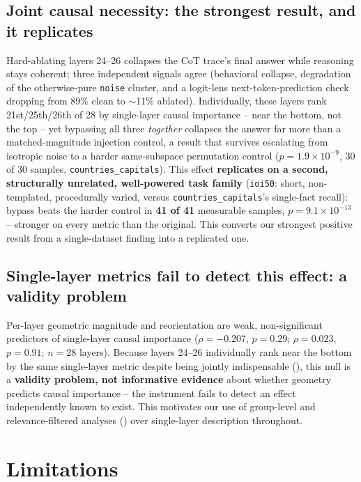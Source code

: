 \documentclass{article}
\theoremstyle{plain}
\theoremstyle{definition}
\theoremstyle{remark}
\begin{document}
\subsection{Joint causal necessity: the strongest result, and it replicates}
\label{sec:results:necessity}

Hard-ablating layers 24--26 collapses the CoT trace's final answer while reasoning stays
coherent; three independent signals agree (behavioral collapse, degradation of the
otherwise-pure \texttt{noise} cluster, and a logit-lens next-token-prediction check
dropping from 89\% clean to $\sim$11\% ablated). Individually, these layers rank
21st/25th/26th of 28 by single-layer causal importance -- near the bottom, not the top --
yet bypassing all three \emph{together} collapses the answer far more than a
matched-magnitude injection control, a result that survives escalating from isotropic
noise to a harder same-subspace permutation control ($p=1.9\times10^{-9}$, 30 of 30
samples, \texttt{countries\_capitals}). This effect \textbf{replicates on a second,
structurally unrelated, well-powered task family} (\texttt{ioi50}: short, non-templated,
procedurally varied, versus \texttt{countries\_capitals}'s single-fact recall): bypass
beats the harder control in \textbf{41 of 41} measurable samples,
$p=9.1\times10^{-13}$ -- stronger on every metric than the original. This converts our
strongest positive result from a single-dataset finding into a replicated one.

\subsection{Single-layer metrics fail to detect this effect: a validity problem}
\label{sec:results:validity}

Per-layer geometric magnitude and reorientation are weak, non-significant predictors of
single-layer causal importance ($\rho=-0.207$, $p=0.29$; $\rho=0.023$, $p=0.91$;
$n=28$ layers). Because layers 24--26 individually rank near the bottom by the same
single-layer metric despite being jointly indispensable (),
this null is a \textbf{validity problem, not informative evidence} about whether geometry
predicts causal importance -- the instrument fails to detect an effect independently
known to exist. This motivates our use of group-level and relevance-filtered analyses
() over single-layer description throughout.

\section{Limitations}
\label{sec:limitations}
\end{document}
